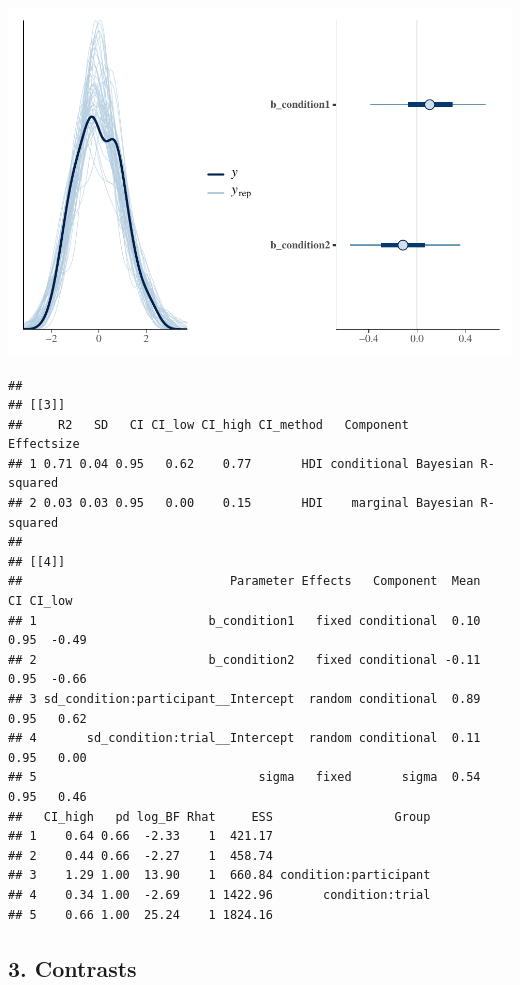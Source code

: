 \documentclass[
]{article}
\begin{document}
\includegraphics{06_Publish_GUSO_ASIL_files/figure-latex/DiagnosticsQ-4.pdf}

\begin{verbatim}
## 
## [[3]]
##     R2   SD   CI CI_low CI_high CI_method   Component         Effectsize
## 1 0.71 0.04 0.95   0.62    0.77       HDI conditional Bayesian R-squared
## 2 0.03 0.03 0.95   0.00    0.15       HDI    marginal Bayesian R-squared
## 
## [[4]]
##                             Parameter Effects   Component  Mean   CI CI_low
## 1                        b_condition1   fixed conditional  0.10 0.95  -0.49
## 2                        b_condition2   fixed conditional -0.11 0.95  -0.66
## 3 sd_condition:participant__Intercept  random conditional  0.89 0.95   0.62
## 4       sd_condition:trial__Intercept  random conditional  0.11 0.95   0.00
## 5                               sigma   fixed       sigma  0.54 0.95   0.46
##   CI_high   pd log_BF Rhat     ESS                 Group
## 1    0.64 0.66  -2.33    1  421.17                      
## 2    0.44 0.66  -2.27    1  458.74                      
## 3    1.29 1.00  13.90    1  660.84 condition:participant
## 4    0.34 1.00  -2.69    1 1422.96       condition:trial
## 5    0.66 1.00  25.24    1 1824.16
\end{verbatim}

\hypertarget{contrasts-1}{%
\subsection{3. Contrasts}\label{contrasts-1}}
\end{document}
